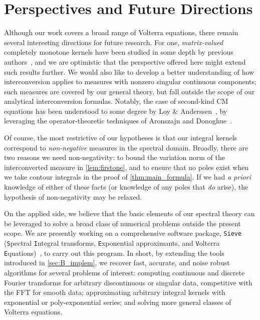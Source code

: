 \documentclass{cams-l} %
\newcommand{\dave}[1]{#1}\newcommand{\davebegin}{}\newcommand{\daveend}{}\newcommand{\george}[1]{#1}
\theoremstyle{definition}
\theoremstyle{remark}
\numberwithin{equation}{section}
\begin{document}
\section{Perspectives and Future Directions}
\dave{Although our work covers a broad range of Volterra equations, there remain several interesting directions for future research. For one, \emph{matrix-valued} completely monotone kernels have been studied in some depth by previous authors~\cite{Gripenberg_Londen_Staffans_1990}, and we are optimistic that the perspective offered here might extend such results further. We would also like to develop a better understanding of how interconversion applies to measures with nonzero singular continuous components; such measures are covered by our general theory, but fall outside the scope of our analytical interconversion formulas. Notably, the case of second-kind CM equations has been understood to some degree by Loy \& Anderssen~\cite{loy_anderssen}, by leveraging the operator-theoretic techniques of Aronszajn and Donoghue~\cite{e48c169e-0374-3786-a618-5e3861c40257,https://doi.org/10.1002/cpa.3160180402}}.

Of course, the most restrictive of our hypotheses is that our integral kernels correspond to \emph{non-negative} measures in the spectral domain. Broadly, there are two reasons we need \dave{non-negativity}: to bound the variation norm of the interconverted measure in \cref{lem:firstone}, and to ensure that no poles exist when we take contour integrals in the proof of \cref{thm:main_formula}. If we had \emph{a priori} knowledge of either of these facts (or knowledge of any poles that \emph{do} arise), \dave{the hypothesis of non-negativity may be relaxed}.

\dave{On the applied side, we believe that the basic elements of our spectral theory can be leveraged to solve a broad class of numerical problems outside the present scope. We are presently working on a comprehensive software package, \texttt{Sieve} (\texttt{S}pectral \texttt{I}ntegral transforms, \texttt{E}xponential approximants, and \texttt{V}olterra \texttt{E}quations)~\cite{sieve}, to carry out this program. In short, by extending the tools introduced in \cref{sec:B_implem}, we recover fast, accurate, and noise robust algorithms for several problems of interest: computing continuous and discrete Fourier transforms for arbitrary discontinuous or singular data, competitive with the FFT for smooth data; approximating arbitrary integral kernels with exponential or poly-exponential series; and solving more general classes of Volterra equations. }
\end{document}
